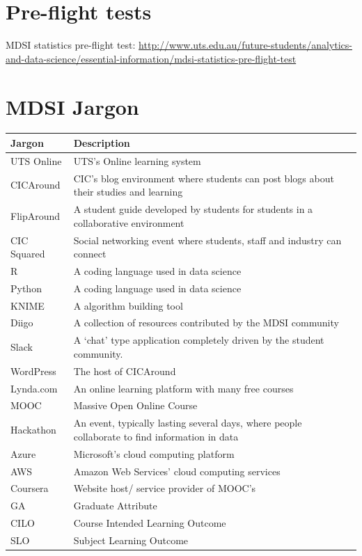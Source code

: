 \documentclass[]{book}
\theoremstyle{definition}
\theoremstyle{definition}
\theoremstyle{remark}
\begin{document}
\section{Pre-flight tests}\label{pre-flight-tests}

MDSI statistics pre-flight test:
\url{http://www.uts.edu.au/future-students/analytics-and-data-science/essential-information/mdsi-statistics-pre-flight-test}

\section{MDSI Jargon}\label{mdsi-jargon}

\begin{tabular}{l|l}
\hline
Jargon & Description\\
\hline
UTS Online & UTS’s Online learning system\\
\hline
CICAround & CIC’s blog environment where students can post blogs about their studies and learning\\
\hline
FlipAround & A student guide developed by students for students in a collaborative environment\\
\hline
CIC Squared & Social networking event where students, staff and industry can connect\\
\hline
R & A coding language used in data science\\
\hline
Python & A coding language used in data science\\
\hline
KNIME & A algorithm building tool\\
\hline
Diigo & A collection of resources contributed by the MDSI community\\
\hline
Slack & A ‘chat’ type application completely driven by the student community.\\
\hline
WordPress & The host of CICAround\\
\hline
Lynda.com & An online learning platform with many free courses\\
\hline
MOOC & Massive Open Online Course\\
\hline
Hackathon & An event, typically lasting several days, where people collaborate to find information in data\\
\hline
Azure & Microsoft’s cloud computing platform\\
\hline
AWS & Amazon Web Services’ cloud computing services\\
\hline
Coursera & Website host/ service provider of MOOC’s\\
\hline
GA & Graduate Attribute\\
\hline
CILO & Course Intended Learning Outcome\\
\hline
SLO & Subject Learning Outcome\\
\hline
\end{tabular}
\end{document}
